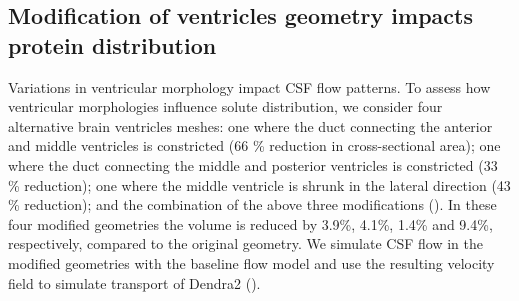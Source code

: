\documentclass{WileyMSP-template}
\begin{document}
\subsection{Modification of ventricles geometry impacts protein distribution}
Variations in ventricular morphology impact CSF flow patterns.
To assess how ventricular morphologies influence solute distribution,
we consider four alternative brain ventricles meshes:
one where the duct connecting the anterior and middle ventricles is constricted
(66 \% reduction in cross-sectional area);
one where the duct connecting the middle and posterior ventricles is constricted
(33 \% reduction);
one where the middle ventricle is shrunk in the lateral direction (43 \% reduction);
and the combination of the above three modifications (). In these
four modified geometries the volume is reduced by 3.9\%, 4.1\%, 1.4\% and 9.4\%, respectively,
compared to the original geometry.
We simulate CSF flow in the modified geometries with the baseline flow model
and use the resulting velocity field to simulate transport of Dendra2
().
\end{document}
